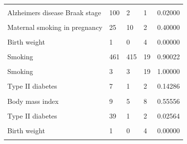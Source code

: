\documentclass[11pt,oneside]{bristolthesis}
\begin{document}
\begin{table}
{\begin{tabular}[t]{lllll}
\cellcolor{gray!6}{Alzheimers disease Braak stage} & \cellcolor{gray!6}{2} & \cellcolor{gray!6}{2} & \cellcolor{gray!6}{1} & \cellcolor{gray!6}{1.00000}\\
\addlinespace
Alzheimers disease Braak stage & 100 & 2 & 1 & 0.02000\\
\cellcolor{gray!6}{Smoking} & \cellcolor{gray!6}{37} & \cellcolor{gray!6}{35} & \cellcolor{gray!6}{19} & \cellcolor{gray!6}{0.94595}\\
Maternal smoking in pregnancy & 25 & 10 & 2 & 0.40000\\
\cellcolor{gray!6}{Smoking} & \cellcolor{gray!6}{53} & \cellcolor{gray!6}{48} & \cellcolor{gray!6}{19} & \cellcolor{gray!6}{0.90566}\\
Birth weight & 1 & 0 & 4 & \vphantom{1}0.00000\\
\addlinespace
\cellcolor{gray!6}{Maternal smoking in pregnancy} & \cellcolor{gray!6}{22} & \cellcolor{gray!6}{19} & \cellcolor{gray!6}{2} & \cellcolor{gray!6}{0.86364}\\
Smoking & 461 & 415 & 19 & 0.90022\\
\cellcolor{gray!6}{High-density lipoprotein cholesterol} & \cellcolor{gray!6}{1} & \cellcolor{gray!6}{1} & \cellcolor{gray!6}{1} & \cellcolor{gray!6}{1.00000}\\
Smoking & 3 & 3 & 19 & 1.00000\\
\cellcolor{gray!6}{Body mass index} & \cellcolor{gray!6}{76} & \cellcolor{gray!6}{30} & \cellcolor{gray!6}{8} & \cellcolor{gray!6}{0.39474}\\
\addlinespace
Type II diabetes & 7 & 1 & 2 & 0.14286\\
\cellcolor{gray!6}{Body mass index} & \cellcolor{gray!6}{1} & \cellcolor{gray!6}{1} & \cellcolor{gray!6}{8} & \cellcolor{gray!6}{1.00000}\\
Body mass index & 9 & 5 & 8 & 0.55556\\
\cellcolor{gray!6}{Smoking} & \cellcolor{gray!6}{19} & \cellcolor{gray!6}{14} & \cellcolor{gray!6}{19} & \cellcolor{gray!6}{0.73684}\\
Type II diabetes & 39 & 1 & 2 & 0.02564\\
\addlinespace
\cellcolor{gray!6}{Smoking} & \cellcolor{gray!6}{6} & \cellcolor{gray!6}{6} & \cellcolor{gray!6}{19} & \cellcolor{gray!6}{1.00000}\\
Birth weight & 1 & 0 & 4 & 0.00000\\
\cellcolor{gray!6}{Type II diabetes} & \cellcolor{gray!6}{1} & \cellcolor{gray!6}{1} & \cellcolor{gray!6}{2} & \cellcolor{gray!6}{1.00000}\\

\end{tabular}}
\end{table}
\end{document}
